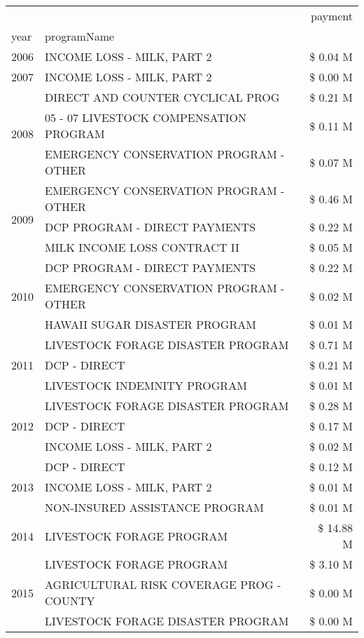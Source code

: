 \begin{tabular}{llr}
\toprule
 &  & payment \\
year & programName &  \\
\midrule
2006 & INCOME LOSS - MILK, PART 2 & \$ 0.04 M \\
\cline{1-3}
2007 & INCOME LOSS - MILK, PART 2 & \$ 0.00 M \\
\cline{1-3}
\multirow[t]{3}{*}{2008} & DIRECT AND COUNTER CYCLICAL PROG & \$ 0.21 M \\
 & 05 - 07 LIVESTOCK COMPENSATION PROGRAM & \$ 0.11 M \\
 & EMERGENCY CONSERVATION PROGRAM - OTHER & \$ 0.07 M \\
\cline{1-3}
\multirow[t]{3}{*}{2009} & EMERGENCY CONSERVATION PROGRAM - OTHER & \$ 0.46 M \\
 & DCP PROGRAM - DIRECT PAYMENTS & \$ 0.22 M \\
 & MILK INCOME LOSS CONTRACT II & \$ 0.05 M \\
\cline{1-3}
\multirow[t]{3}{*}{2010} & DCP PROGRAM - DIRECT PAYMENTS & \$ 0.22 M \\
 & EMERGENCY CONSERVATION PROGRAM - OTHER & \$ 0.02 M \\
 & HAWAII SUGAR DISASTER PROGRAM & \$ 0.01 M \\
\cline{1-3}
\multirow[t]{3}{*}{2011} & LIVESTOCK FORAGE DISASTER PROGRAM & \$ 0.71 M \\
 & DCP - DIRECT & \$ 0.21 M \\
 & LIVESTOCK INDEMNITY PROGRAM & \$ 0.01 M \\
\cline{1-3}
\multirow[t]{3}{*}{2012} & LIVESTOCK FORAGE DISASTER PROGRAM & \$ 0.28 M \\
 & DCP - DIRECT & \$ 0.17 M \\
 & INCOME LOSS - MILK, PART 2 & \$ 0.02 M \\
\cline{1-3}
\multirow[t]{3}{*}{2013} & DCP - DIRECT & \$ 0.12 M \\
 & INCOME LOSS - MILK, PART 2 & \$ 0.01 M \\
 & NON-INSURED ASSISTANCE PROGRAM & \$ 0.01 M \\
\cline{1-3}
2014 & LIVESTOCK FORAGE PROGRAM & \$ 14.88 M \\
\cline{1-3}
\multirow[t]{3}{*}{2015} & LIVESTOCK FORAGE PROGRAM & \$ 3.10 M \\
 & AGRICULTURAL RISK COVERAGE PROG - COUNTY & \$ 0.00 M \\
 & LIVESTOCK FORAGE DISASTER PROGRAM & \$ 0.00 M \\
\cline{1-3}

\end{tabular}
